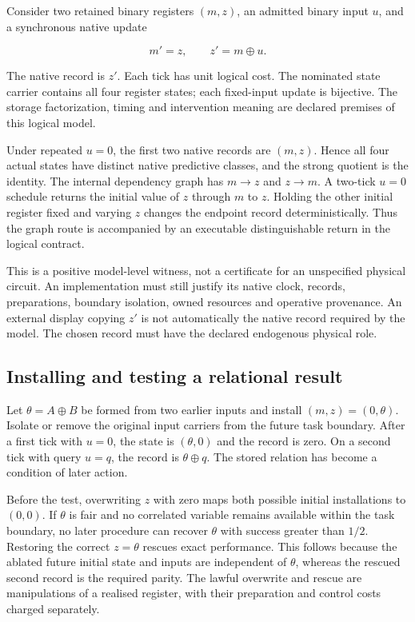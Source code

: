 \documentclass[
  11pt,
  a4paper,
]{article}
\begin{document}
Consider two retained binary registers \((m,z)\), an admitted binary
input \(u\), and a synchronous native update

\[m'=z,\qquad z'=m\oplus u.\]

The native record is \(z'\). Each tick has unit logical cost. The
nominated state carrier contains all four register states; each
fixed-input update is bijective. The storage factorization, timing and
intervention meaning are declared premises of this logical model.

Under repeated \(u=0\), the first two native records are \((m,z)\).
Hence all four actual states have distinct native predictive classes,
and the strong quotient is the identity. The internal dependency graph
has \(m\to z\) and \(z\to m\). A two-tick \(u=0\) schedule returns the
initial value of \(z\) through \(m\) to \(z\). Holding the other initial
register fixed and varying \(z\) changes the endpoint record
deterministically. Thus the graph route is accompanied by an executable
distinguishable return in the logical contract.

This is a positive model-level witness, not a certificate for an
unspecified physical circuit. An implementation must still justify its
native clock, records, preparations, boundary isolation, owned resources
and operative provenance. An external display copying \(z'\) is not
automatically the native record required by the model. The chosen record
must have the declared endogenous physical role.

\subsection{Installing and testing a relational
result}\label{installing-and-testing-a-relational-result}

Let \(\theta=A\oplus B\) be formed from two earlier inputs and install
\((m,z)=(0,\theta)\). Isolate or remove the original input carriers from
the future task boundary. After a first tick with \(u=0\), the state is
\((\theta,0)\) and the record is zero. On a second tick with query
\(u=q\), the record is \(\theta\oplus q\). The stored relation has
become a condition of later action.

Before the test, overwriting \(z\) with zero maps both possible initial
installations to \((0,0)\). If \(\theta\) is fair and no correlated
variable remains available within the task boundary, no later procedure
can recover \(\theta\) with success greater than \(1/2\). Restoring the
correct \(z=\theta\) rescues exact performance. This follows because the
ablated future initial state and inputs are independent of \(\theta\),
whereas the rescued second record is the required parity. The lawful
overwrite and rescue are manipulations of a realised register, with
their preparation and control costs charged separately.
\end{document}
